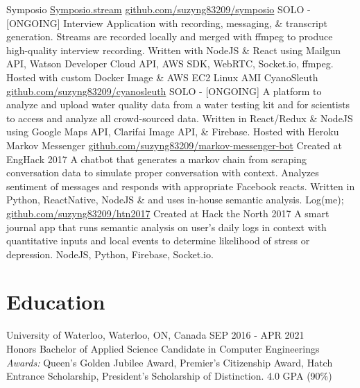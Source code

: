 \documentclass[]{friggeri-cv}
\begin{document}
\begin{entrylist}
	\entry
	{Symposio \href{http://symposio.stream}{\footnotesize Symposio.stream} \href{https://github.com/suzyng83209/symposio}{\footnotesize github.com/suzyng83209/symposio}}
	{\vspace{0.5\parsep}SOLO - [ONGOING]}
	{Interview Application with recording, messaging, \& transcript generation. Streams are recorded locally and merged with ffmpeg to produce high-quality interview recording. Written with NodeJS \& React using Mailgun API, Watson Developer Cloud API, AWS SDK, WebRTC, Socket.io, ffmpeg. Hosted with custom Docker Image \& AWS EC2 Linux AMI}
	\entry
	{CyanoSleuth \href{https://github.com/suzyng83209/cyanosleuth}{\footnotesize  github.com/suzyng83209/cyanosleuth}}
	{\vspace{0.5\parsep}SOLO - [ONGOING]}
	{A platform to analyze and upload water quality data from a water testing kit and for scientists to access and analyze all crowd-sourced data. Written in React/Redux \& NodeJS using Google Maps API, Clarifai Image API, \& Firebase. Hosted with Heroku}
	\entry
	{Markov Messenger \href{https://github.com/suzyng83209/markov-messenger-bot}{\footnotesize  github.com/suzyng83209/markov-messenger-bot}}
	{\vspace{0.5\parsep}Created at EngHack 2017}
	{A chatbot that generates a markov chain from scraping conversation data to simulate proper conversation with context. Analyzes sentiment of messages and responds with appropriate Facebook reacts. Written in Python, ReactNative, NodeJS \& and uses in-house semantic analysis.}
	\entry
	{Log(me); \href{https://github.com/suzyng83209/htn2017}{\footnotesize github.com/suzyng83209/htn2017}}
	{\vspace{0.5\parsep}Created at Hack the North 2017}
	{A smart journal app that runs semantic analysis on user's daily logs in context with quantitative inputs and local events to determine likelihood of stress or depression. NodeJS, Python, Firebase, Socket.io.}
\end{entrylist}

\section{Education}

\begin{entrylist}
	\entry
	{University of Waterloo, Waterloo, ON, Canada \hfill{SEP 2016 - APR 2021}}
	{\\{\normalsize\normalfont Honors Bachelor of Applied Science Candidate in Computer Engineerings}}
	{\emph{Awards:} Queen's Golden Jubilee Award, Premier's Citizenship Award, Hatch Entrance Scholarship, President's Scholarship of Distinction. 4.0 GPA (90\%)}
\end{entrylist}
\end{document}
